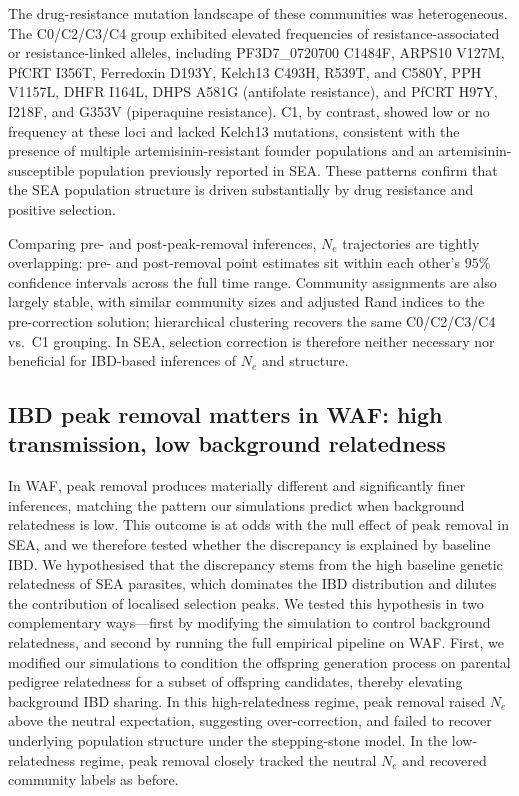 \documentclass[11pt]{article}
\begin{document}
The drug-resistance mutation landscape of these communities was heterogeneous. The C0/C2/C3/C4 group exhibited elevated frequencies of resistance-associated or resistance-linked alleles, including PF3D7\_0720700 C1484F, ARPS10 V127M, PfCRT I356T, Ferredoxin D193Y, Kelch13 C493H, R539T, and C580Y, PPH V1157L, DHFR I164L, DHPS A581G (antifolate resistance), and PfCRT H97Y, I218F, and G353V (piperaquine resistance). C1, by contrast, showed low or no frequency at these loci and lacked Kelch13 mutations, consistent with the presence of multiple artemisinin-resistant founder populations and an artemisinin-susceptible population previously reported in SEA. These patterns confirm that the SEA population structure is driven substantially by drug resistance and positive selection.

Comparing pre- and post-peak-removal inferences, $N_e$ trajectories are tightly overlapping: pre- and post-removal point estimates sit within each other's $95\%$ confidence intervals across the full time range. Community assignments are also largely stable, with similar community sizes and adjusted Rand indices to the pre-correction solution; hierarchical clustering recovers the same C0/C2/C3/C4 vs.\ C1 grouping. In SEA, selection correction is therefore neither necessary nor beneficial for IBD-based inferences of $N_e$ and structure.

\subsection{IBD peak removal matters in WAF: high transmission, low background relatedness}

In WAF, peak removal produces materially different and significantly finer inferences, matching the pattern our simulations predict when background relatedness is low. This outcome is at odds with the null effect of peak removal in SEA, and we therefore tested whether the discrepancy is explained by baseline IBD. We hypothesised that the discrepancy stems from the high baseline genetic relatedness of SEA parasites, which dominates the IBD distribution and dilutes the contribution of localised selection peaks. We tested this hypothesis in two complementary ways—first by modifying the simulation to control background relatedness, and second by running the full empirical pipeline on WAF. First, we modified our simulations to condition the offspring generation process on parental pedigree relatedness for a subset of offspring candidates, thereby elevating background IBD sharing. In this high-relatedness regime, peak removal raised $N_e$ above the neutral expectation, suggesting over-correction, and failed to recover underlying population structure under the stepping-stone model. In the low-relatedness regime, peak removal closely tracked the neutral $N_e$ and recovered community labels as before.
\end{document}
